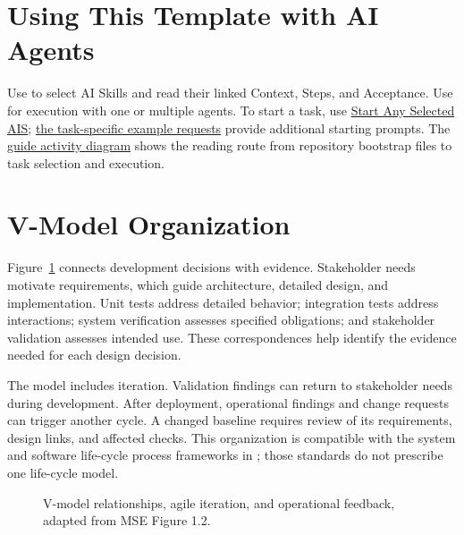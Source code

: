 \section{Using This Template with AI Agents}
\label{Section:UsingTemplateAI}
Use  to select AI Skills and read their
linked Context, Steps, and Acceptance. Use
 for execution with one or multiple
agents. To start a task, use
\hyperref[Section:AIStartSelectedTaskPrompt]{Start Any Selected AIS};
\hyperref[Section:AIExamplePrompts]{the task-specific example requests}
provide additional starting prompts. The
\hyperref[Figure:AIGuideActivity]{guide activity diagram} shows the reading
route from repository bootstrap files to task selection and execution.

\section{V-Model Organization}
Figure~\ref{Figure:VModel} connects development decisions with evidence.
Stakeholder needs motivate requirements, which guide architecture, detailed
design, and implementation. Unit tests address detailed behavior; integration
tests address interactions; system verification assesses specified obligations;
and stakeholder validation assesses intended use. These correspondences help
identify the evidence needed for each design decision.

The model includes iteration. Validation findings can return to stakeholder
needs during development. After deployment, operational findings and change
requests can trigger another cycle. A changed baseline requires review of its
requirements, design links, and affected checks. This organization is
compatible with the system and software life-cycle process frameworks in
\cite{ISO15288,ISO12207}; those standards do not prescribe one life-cycle model.

\begin{figure}[htbp]
\centering
\resizebox{\textwidth}{!}{}
\caption{V-model relationships, agile iteration, and operational feedback, adapted from MSE Figure 1.2.}
\label{Figure:VModel}
\end{figure}
